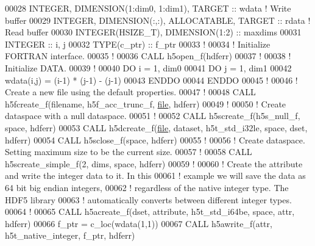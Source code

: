 \begin{DoxyCode}
00028   \textcolor{keywordtype}{INTEGER}, \textcolor{keywordtype}{DIMENSION(1:dim0, 1:dim1)}, \textcolor{keywordtype}{TARGET} :: wdata \textcolor{comment}{! Write buffer}
00029   \textcolor{keywordtype}{INTEGER}, \textcolor{keywordtype}{DIMENSION(:,:)}, \textcolor{keywordtype}{ALLOCATABLE}, \textcolor{keywordtype}{TARGET} :: rdata \textcolor{comment}{! Read buffer}
00030   \textcolor{keywordtype}{INTEGER(HSIZE\_T)}, \textcolor{keywordtype}{DIMENSION(1:2)} :: maxdims
00031   \textcolor{keywordtype}{INTEGER} :: i, j
00032   \textcolor{keywordtype}{TYPE}(c\_ptr) :: f\_ptr
00033   \textcolor{comment}{!}
00034   \textcolor{comment}{! Initialize FORTRAN interface.}
00035   \textcolor{comment}{!}
00036   \textcolor{keyword}{CALL }h5open\_f(hdferr)
00037   \textcolor{comment}{!}
00038   \textcolor{comment}{! Initialize DATA.}
00039   \textcolor{comment}{!}
00040   \textcolor{keywordflow}{DO} i = 1, dim0
00041      \textcolor{keywordflow}{DO} j = 1, dim1
00042         wdata(i,j) = (i-1) * (j-1) - (j-1)
00043 \textcolor{keywordflow}{     ENDDO}
00044 \textcolor{keywordflow}{  ENDDO}
00045   \textcolor{comment}{!}
00046   \textcolor{comment}{! Create a new file using the default properties.}
00047   \textcolor{comment}{!}
00048   \textcolor{keyword}{CALL }h5fcreate\_f(filename, h5f\_acc\_trunc\_f, \hyperlink{structfile}{file}, hdferr)
00049   \textcolor{comment}{!}
00050   \textcolor{comment}{! Create dataspace with a null dataspace.}
00051   \textcolor{comment}{!}
00052   \textcolor{keyword}{CALL }h5screate\_f(h5s\_null\_f, space, hdferr)
00053   \textcolor{keyword}{CALL }h5dcreate\_f(\hyperlink{structfile}{file}, dataset, h5t\_std\_i32le, space, dset, hdferr)
00054   \textcolor{keyword}{CALL }h5sclose\_f(space, hdferr)
00055   \textcolor{comment}{!}
00056   \textcolor{comment}{! Create dataspace.  Setting maximum size to be the current size.}
00057   \textcolor{comment}{!}
00058   \textcolor{keyword}{CALL }h5screate\_simple\_f(2, dims, space, hdferr)
00059   \textcolor{comment}{!}
00060   \textcolor{comment}{! Create the attribute and write the integer data to it.  In this}
00061   \textcolor{comment}{! example we will save the data as 64 bit big endian integers,}
00062   \textcolor{comment}{! regardless of the native integer type.  The HDF5 library}
00063   \textcolor{comment}{! automatically converts between different integer types.}
00064   \textcolor{comment}{!}
00065   \textcolor{keyword}{CALL }h5acreate\_f(dset, attribute, h5t\_std\_i64be, space, attr, hdferr)
00066   f\_ptr = c\_loc(wdata(1,1))
00067   \textcolor{keyword}{CALL }h5awrite\_f(attr, h5t\_native\_integer, f\_ptr, hdferr)

\end{DoxyCode}

